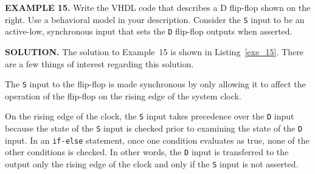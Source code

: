 \begin{leftbar}
\begin{minipage}{0.5\linewidth}
\noindent
\textbf{EXAMPLE 15.}
Write the VHDL code that describes a D flip-flop shown on the right. Use a behavioral model in your description. Consider the \texttt{S} input to be an active-low, synchronous input that sets the \texttt{D} flip-flop outputs when asserted.
\end{minipage}
\begin{minipage}{0.47\linewidth}
\begin{flushright}
\end{flushright}
\end{minipage}
\end{leftbar}
\noindent
\textbf{SOLUTION.} The solution to Example~15 is shown in Listing~\ref{exe_15}. There are a few things of interest regarding this solution.
\begin{my_list}
\item The \texttt{S} input to the flip-flop is made synchronous by only allowing it to affect the operation of the flip-flop on the rising edge of the system clock. 
\item On the rising edge of the clock, the \texttt{S} input takes precedence over the \texttt{D} input because the state of the \texttt{S} input is checked prior to examining the state of the \texttt{D} input. In an \texttt{if-else} statement, once one condition evaluates as true, none of the other conditions is checked. In other words, the \texttt{D} input is transferred to the output only the rising edge of the clock and only if the \texttt{S} input is not asserted.
\end{my_list}

